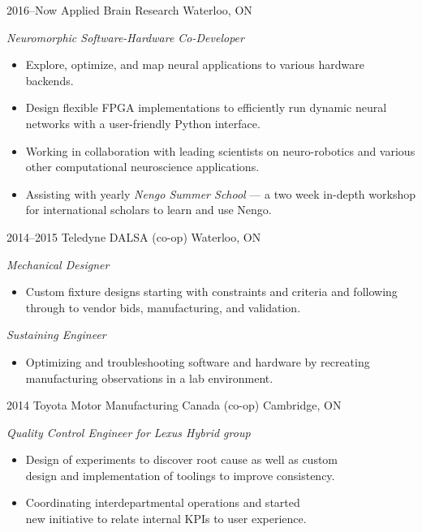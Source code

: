 \documentclass[a4paper,nocolors]{cv-friggeri-ben}
\begin{document}
\begin{entrylist}

\entry
    {2016--Now}
    {Applied Brain Research}
    {Waterloo, ON}
    {\emph{Neuromorphic Software-Hardware Co-Developer}
    \begin{itemize}
        \item Explore, optimize, and map neural applications to various
            hardware backends.
        \item Design flexible FPGA implementations to efficiently run dynamic
            neural networks with a user-friendly Python interface.
        \item Working in collaboration with leading scientists on
            neuro-robotics and various other computational neuroscience
            applications.
        \item Assisting with yearly \emph{Nengo Summer School} --- a two week
            in-depth workshop for international scholars to learn and use Nengo.
    \end{itemize}}

\entry
    {2014--2015}
    {Teledyne DALSA {\normalfont (co-op)}}
    {Waterloo, ON}
    {\emph{Mechanical Designer}
    \begin{itemize}
        \item Custom fixture designs starting with constraints and criteria and
            following through to vendor bids, manufacturing, and validation.
    \end{itemize}
    \emph{Sustaining Engineer}
    \begin{itemize}
        \item Optimizing and troubleshooting software and hardware by recreating
            manufacturing observations in a lab environment.
    \end{itemize}}

\entry
    {2014}
    {Toyota Motor Manufacturing Canada {\normalfont (co-op)}}
    {Cambridge, ON}
    {\emph{Quality Control Engineer for Lexus Hybrid group}
    \begin{itemize}
        \item Design of experiments to discover root cause as well as custom\\
            design and implementation of toolings to improve consistency.
        \item Coordinating interdepartmental operations and started \\
            new initiative to relate internal KPIs to user experience.
    \end{itemize}}

\end{entrylist}  %
\end{document}
